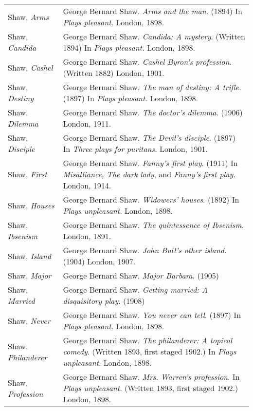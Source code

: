 \begin{longtable}{p{} p{}}
Shaw, \textit{Arms} & George Bernard Shaw. \textit{Arms and the man}. (1894) In \textit{Plays pleasant}. London, 1898. \\ 
Shaw, \textit{Candida} & George Bernard Shaw. \textit{Candida: A mystery}. (Written 1894) In \textit{Plays pleasant}. London, 1898. \\ 
Shaw, \textit{Cashel} & George Bernard Shaw. \textit{Cashel Byron's profession}. (Written 1882) London, 1901. \\ 
Shaw, \textit{Destiny} & George Bernard Shaw. \textit{The man of destiny: A trifle}. (1897) In \textit{Plays pleasant}. London, 1898. \\
Shaw, \textit{Dilemma} & George Bernard Shaw. \textit{The doctor's dilemma}. (1906) London, 1911. \\ 
Shaw, \textit{Disciple} & George Bernard Shaw. \textit{The Devil's disciple}. (1897) In \textit{Three plays for puritans}. London, 1901. \\ 
Shaw, \textit{First} & George Bernard Shaw. \textit{Fanny's first play}. (1911) In \textit{Misalliance, The dark lady}, and \textit{Fanny's first play}. London, 1914. \\ 
Shaw, \textit{Houses} & George Bernard Shaw. \textit{Widowers' houses}. (1892) In \textit{Plays unpleasant}. London, 1898. \\ 
Shaw, \textit{Ibsenism} & George Bernard Shaw. \textit{The quintessence of Ibsenism}. London, 1891. \\ 
Shaw, \textit{Island} & George Bernard Shaw. \textit{John Bull's other island}. (1904) London, 1907. \\ 
Shaw, \textit{Major} & George Bernard Shaw. \textit{Major Barbara}. (1905) \\ 
Shaw, \textit{Married} & George Bernard Shaw. \textit{Getting married: A disquisitory play}. (1908) \\
Shaw, \textit{Never} & George Bernard Shaw. \textit{You never can tell}. (1897) In \textit{Plays pleasant}. London, 1898. \\ 
Shaw, \textit{Philanderer} & George Bernard Shaw. \textit{The philanderer: A topical comedy}. (Written 1893, first staged 1902.) In \textit{Plays unpleasant}. London, 1898. \\ 
Shaw, \textit{Profession} & George Bernard Shaw. \textit{Mrs. Warren's profession}. In \textit{Plays unpleasant}. (Written 1893, first staged 1902.) London, 1898. \\


\end{longtable}
